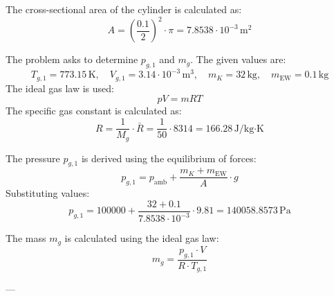 The cross-sectional area of the cylinder is calculated as:  
\[
A = \left(\frac{0.1}{2}\right)^2 \cdot \pi = 7.8538 \cdot 10^{-3} \, \text{m}^2
\]  

The problem asks to determine \( p_{g,1} \) and \( m_g \). The given values are:  
\[
T_{g,1} = 773.15 \, \text{K}, \quad V_{g,1} = 3.14 \cdot 10^{-3} \, \text{m}^3, \quad m_K = 32 \, \text{kg}, \quad m_{\text{EW}} = 0.1 \, \text{kg}
\]  
The ideal gas law is used:  
\[
p V = m R T
\]  
The specific gas constant is calculated as:  
\[
R = \frac{1}{M_g} \cdot \bar{R} = \frac{1}{50} \cdot 8314 = 166.28 \, \text{J/kg·K}
\]  

The pressure \( p_{g,1} \) is derived using the equilibrium of forces:  
\[
p_{g,1} = p_{\text{amb}} + \frac{m_K + m_{\text{EW}}}{A} \cdot g
\]  
Substituting values:  
\[
p_{g,1} = 100000 + \frac{32 + 0.1}{7.8538 \cdot 10^{-3}} \cdot 9.81 = 140058.8573 \, \text{Pa}
\]  

The mass \( m_g \) is calculated using the ideal gas law:  
\[
m_g = \frac{p_{g,1} \cdot V}{R \cdot T_{g,1}}
\]  

---